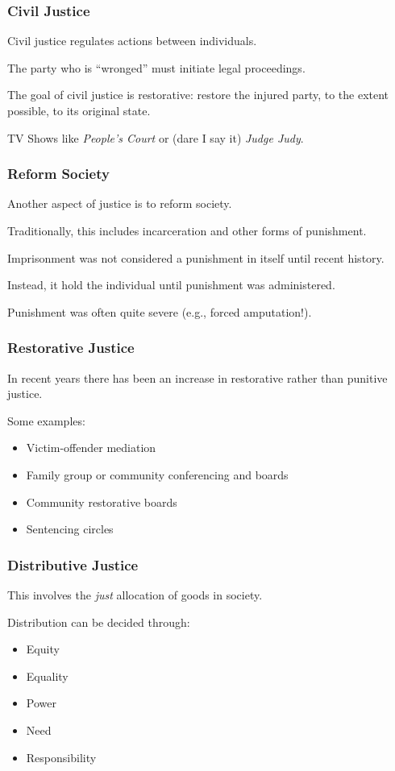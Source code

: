 \begin{frame}
\frametitle{Civil Justice}

Civil justice regulates actions between individuals.

The party who is ``wronged'' must initiate legal proceedings.

The goal of civil justice is \alert{restorative}: restore the injured party, to the extent possible, to its original state.

TV Shows like \textit{People's Court} or (dare I say it) \textit{Judge Judy}.

\end{frame}



\begin{frame}
\frametitle{Reform Society}

Another aspect of justice is to reform society.

Traditionally, this includes incarceration and other forms of punishment.

Imprisonment was not considered a punishment in itself until recent history.

Instead, it hold the individual until punishment was administered.

Punishment was often quite severe (e.g., forced amputation!).

\end{frame}



\begin{frame}
\frametitle{Restorative Justice}

In recent years there has been an increase in restorative rather than punitive justice.

Some examples:

\begin{itemize}
\item Victim-offender mediation
\item Family group or community conferencing and boards
\item Community restorative boards
\item Sentencing circles
\end{itemize}

\end{frame}



\begin{frame}
\frametitle{Distributive Justice}
This involves the \textit{just} allocation of goods in society.

Distribution can be decided through:
\begin{itemize}
	\item Equity
	\item Equality
	\item Power
	\item Need
	\item Responsibility
\end{itemize}

\end{frame}



